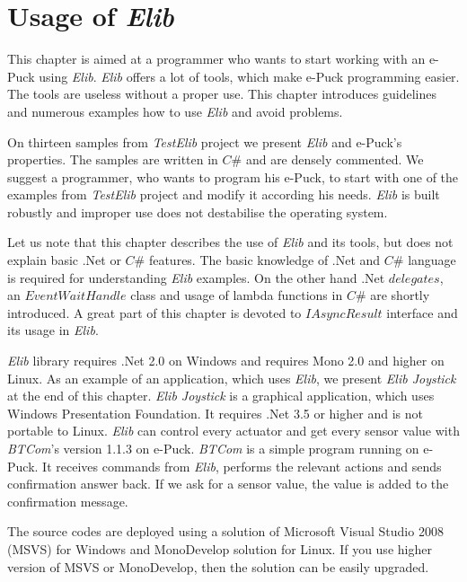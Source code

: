 \chapter{Usage of {\it Elib}} \label{chap:usage}
  This chapter is aimed at a programmer who wants to start working with an e-Puck using {\it Elib}. 
  {\it Elib} offers a lot of tools, which make e-Puck programming easier. 
  The tools are useless without a proper use. This chapter introduces guidelines and numerous
  examples how to use {\it Elib} and avoid problems.
  
  On thirteen samples from {\it TestElib} project we present {\it Elib} and e-Puck's properties.
  The samples are written in $C\#$ and are densely commented.
  We suggest a programmer, who wants to program his e-Puck, to start with one of the examples
  from {\it TestElib} project and modify it according his needs.
  {\it Elib} is built robustly and improper use does not destabilise the operating system.

  Let us note that this chapter describes the use of {\it Elib} and its tools,
  but does not explain basic .Net or $C\#$ features. The basic knowledge of .Net and $C\#$ language is required
  for understanding {\it Elib} examples. On the other hand .Net $delegates$, an $EventWaitHandle$ class and usage of lambda functions in $C\#$
  are shortly introduced. A great part of this chapter is devoted to $IAsyncResult$ interface and its
  usage in {\it Elib}.

  {\it Elib} library requires .Net 2.0 on Windows and requires Mono 2.0 %
  and higher on Linux.
  As an example of an application, which uses {\it Elib}, we present {\it Elib Joystick} at the end of this chapter.
  {\it Elib Joystick} is a graphical application, which uses Windows Presentation Foundation. It requires .Net 3.5 or higher
  and is not portable to Linux.
  {\it Elib} can control every actuator and get every sensor value with {\it BTCom}'s version 1.1.3 on e-Puck. 
  {\it BTCom} is a simple program running on e-Puck. It receives commands from {\it Elib}, performs the relevant actions
  and sends confirmation answer back. If we ask for a sensor value, the value is added to the confirmation message.

  The source codes are deployed using a solution of Microsoft Visual Studio 2008 (MSVS) for Windows 
  and MonoDevelop solution for Linux.
  If you use higher version of MSVS or MonoDevelop, then the solution can be easily upgraded.	

